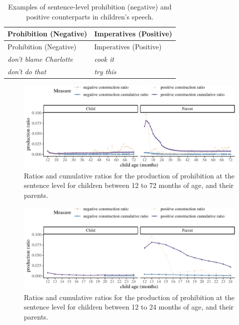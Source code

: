 \documentclass[
  english,
  man,floatsintext]{apa6}
\begin{document}
\begin{longtable}[]{@{}ll@{}}
\caption{\label{tab:prohibit} Examples of sentence-level prohibition (negative) and positive counterparts in children's speech.}\tabularnewline
\toprule
Prohibition (Negative) & Imperatives (Positive) \\
\midrule
\endfirsthead
\toprule
Prohibition (Negative) & Imperatives (Positive) \\
\midrule
\endhead
\emph{don't blame Charlotte} & \emph{cook it} \\
\emph{don't do that} & \emph{try this} \\
\bottomrule
\end{longtable}

\begin{figure}[H]

{\centering \includegraphics{neg_construction_article_files/figure-latex/prohibition-1} 

}

\caption{Ratios and cumulative ratios for the production of prohibition at the sentence level for children between 12 to 72 months of age, and their parents.}\label{fig:prohibition}
\end{figure}

\begin{figure}[H]

{\centering \includegraphics{neg_construction_article_files/figure-latex/prohibitionbegin-1} 

}

\caption{Ratios and cumulative ratios for the production of prohibition at the sentence level for children between 12 to 24 months of age, and their parents.}\label{fig:prohibitionbegin}
\end{figure}
\end{document}
